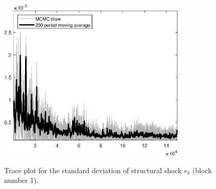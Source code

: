 \begin{figure}[H]
\centering
  \includegraphics[width=0.8\textwidth]{BRS_sectoral_KK/graphs/TracePlot_SE_e_b_blck_1}\\
    \caption{Trace plot for the standard deviation of structural shock ${e_b}$ (block number 1).}
\end{figure}

